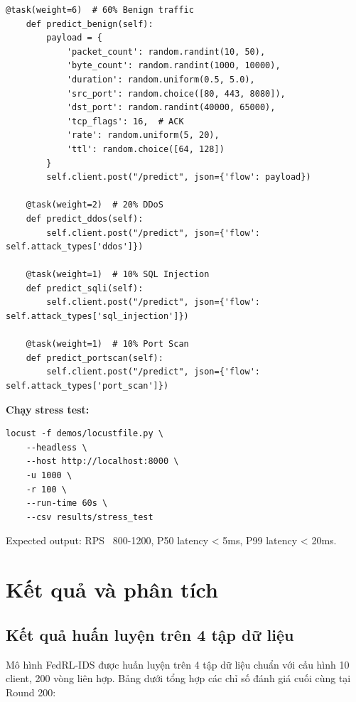 \documentclass[12pt,a4paper]{article}
\begin{document}
\begin{lstlisting}[caption=Locust Stress Test, label=lst:locust]
    @task(weight=6)  # 60% Benign traffic
    def predict_benign(self):
        payload = {
            'packet_count': random.randint(10, 50),
            'byte_count': random.randint(1000, 10000),
            'duration': random.uniform(0.5, 5.0),
            'src_port': random.choice([80, 443, 8080]),
            'dst_port': random.randint(40000, 65000),
            'tcp_flags': 16,  # ACK
            'rate': random.uniform(5, 20),
            'ttl': random.choice([64, 128])
        }
        self.client.post("/predict", json={'flow': payload})

    @task(weight=2)  # 20% DDoS
    def predict_ddos(self):
        self.client.post("/predict", json={'flow': self.attack_types['ddos']})

    @task(weight=1)  # 10% SQL Injection
    def predict_sqli(self):
        self.client.post("/predict", json={'flow': self.attack_types['sql_injection']})

    @task(weight=1)  # 10% Port Scan
    def predict_portscan(self):
        self.client.post("/predict", json={'flow': self.attack_types['port_scan']})
\end{lstlisting}

\textbf{Chạy stress test:}
\begin{verbatim}
locust -f demos/locustfile.py \
    --headless \
    --host http://localhost:8000 \
    -u 1000 \
    -r 100 \
    --run-time 60s \
    --csv results/stress_test
\end{verbatim}

Expected output: RPS ~800-1200, P50 latency < 5ms, P99 latency < 20ms.

\section{Kết quả và phân tích}

\subsection{Kết quả huấn luyện trên 4 tập dữ liệu}

Mô hình FedRL-IDS được huấn luyện trên 4 tập dữ liệu chuẩn với cấu hình 10 client, 200 vòng liên hợp. Bảng dưới tổng hợp các chỉ số đánh giá cuối cùng tại Round 200:
\end{document}

